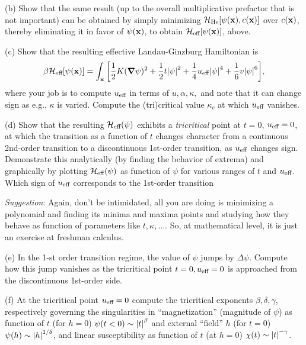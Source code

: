 \documentclass[12pt]{article}
\begin{document}
\begin{problem}{5}
(b) Show that the same result (up to the overall multiplicative prefactor that
is not important) can be obtained by simply minimizing
$\mathcal{H}_{\text{He}}[\psi(\vb{x}),c(\vb{x})]$ over $c(\vb{x})$, thereby eliminating it in
favor of $\psi(\vb{x})$, to obtain $\mathcal{H}_{\text{eff}}[\psi(\vb{x})]$, above.

(c) Show that the resulting effective Landau-Ginzburg Hamiltonian is
\begin{equation}
    \beta\mathcal{H}_{\text{eff}}[\psi(\vb{x})]
    =\int_{\vb{x}}\qty[\frac12K(\grad\psi)^2+\frac12t\abs{\psi}^2
    +\frac14u_{\text{eff}}\abs{\psi}^4+\frac16v\abs{\psi}^6],
\end{equation}
where your job is to compute $u_{\text{eff}}$ in terms of $u,\alpha,\kappa,$ and note
that it can change sign as e.g., $\kappa$ is varied. Compute the (tri)critical
value $\kappa_c$ at which $u_{\text{eff}}$ vanishes.

(d) Show that the resulting $\mathcal{H}_{\text{eff}}(\psi)$ exhibits a \textit{tricritical}
point at $t=0$, $u_{\text{eff}}=0$, at which the transition as a function of $t$
changes character from a continuous 2nd-order transition to a discontinuous
1st-order transition, as $u_{\text{eff}}$ changes sign. Demonstrate this analytically
(by finding the behavior of extrema) and graphically by plotting
$\mathcal{H}_{\text{eff}}(\psi)$ as function of $\psi$ for various ranges of $t$ and
$u_{\text{eff}}$. Which sign of $u_{\text{eff}}$ corresponds to the 1st-order transition

\textit{Suggestion}: Again, don't be intimidated, all you are doing is
minimizing a polynomial and finding its minima and maxima points and studying
how they behave as function of parameters like $t,\kappa,\hdots$. So, at
mathematical level, it is just an exercise at freshman calculus.

(e) In the 1-st order transition regime, the value of $\psi$ jumps by
$\Delta\psi$. Compute how this jump vanishes as the tricritical point
$t=0,u_{\text{eff}}=0$ is approached from the discontinuous 1st-order side.

(f) At the tricritical point $u_{\text{eff}}=0$ compute the tricritical exponents
$\beta,\delta,\gamma$, respectively governing the singularities in
``magnetization'' (magnitude of $\psi$) as function of $t$ (for $h=0$)
$\psi(t<0)\sim \abs{t}^\beta$ and external ``field'' $h$ (for $t=0$)
$\psi(h)\sim \abs{h}^{1/\delta}$, and linear susceptibility as function of $t$
(at $h=0$) $\chi(t)\sim\abs{t}^{-\gamma}$.
\begin{solution}
\end{solution}
\end{problem}
\newpage
\end{document}
